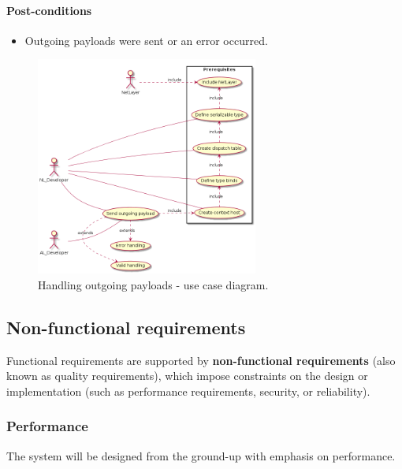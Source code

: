 \documentclass[12pt]{report}
\newcommand{\+}{\discretionary{\mbox{\scriptsize$\hookleftarrow$}}{}{}}
\renewcommand\emph{\textbf}
\begin{document}
                    \paragraph{Post-conditions}
                        \begin{itemize}
                            \item Outgoing payloads were sent or an error occurred.
                        \end{itemize}

                    \begin{figure}[H]
                    \caption{Handling outgoing payloads - use case diagram.}
                    \centering
                    \includegraphics[width=0.65\textwidth]{d/uc/outgoing.png}
                    \end{figure}



            \newpage

            \subsection{Non-functional requirements}
                Functional requirements are supported by \emph{non-functional requirements} (also known as quality requirements), which impose constraints on the design or implementation (such as performance requirements, security, or reliability).

                \subsubsection{Performance}
                    The system will be designed from the ground-up with emphasis on performance. 
\end{document}
